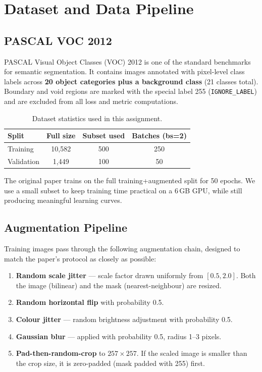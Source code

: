\documentclass[12pt,a4paper]{article}
\newcommand{\code}[1]{\texttt{#1}}
\begin{document}
\section{Dataset and Data Pipeline}

\subsection{PASCAL VOC 2012}

PASCAL Visual Object Classes (VOC) 2012 is one of the standard benchmarks for
semantic segmentation.  It contains images annotated with pixel-level class
labels across \textbf{20 object categories plus a background class} (21 classes
total).  Boundary and void regions are marked with the special label 255
(\code{IGNORE\_LABEL}) and are excluded from all loss and metric computations.

\begin{table}[H]
\centering
\caption{Dataset statistics used in this assignment.}
\label{tab:dataset}
\begin{tabular}{lccc}
\toprule
\textbf{Split} & \textbf{Full size} & \textbf{Subset used} & \textbf{Batches (bs=2)} \\
\midrule
Training   & 10,582 & 500 & 250 \\
Validation & 1,449  & 100 & 50  \\
\bottomrule
\end{tabular}
\end{table}

The original paper trains on the full training+augmented split for 50 epochs.
We use a small subset to keep training time practical on a 6\,GB GPU, while
still producing meaningful learning curves.

\subsection{Augmentation Pipeline}

Training images pass through the following augmentation chain, designed to
match the paper's protocol as closely as possible:

\begin{enumerate}[noitemsep]
    \item \textbf{Random scale jitter} — scale factor drawn uniformly from $[0.5, 2.0]$.
          Both the image (bilinear) and the mask (nearest-neighbour) are resized.
    \item \textbf{Random horizontal flip} with probability 0.5.
    \item \textbf{Colour jitter} — random brightness adjustment with probability 0.5.
    \item \textbf{Gaussian blur} — applied with probability 0.5, radius 1--3 pixels.
    \item \textbf{Pad-then-random-crop} to $257\times257$.  If the scaled image is smaller
          than the crop size, it is zero-padded (mask padded with 255) first.
\end{enumerate}
\end{document}
